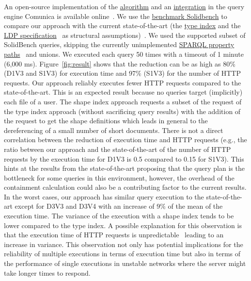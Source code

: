 An open-source implementation of the \href{https://github.com/constraintAutomaton/query-shape-detection}{algorithm} and an 
\href{https://github.com/constraintAutomaton/comunica-feature-link-traversal/tree/feature/shapeIndex}{integration} in the query engine 
Comunica \cite{taelman_iswc_resources_comunica_2018} is available online~.
We use the \href{https://github.com/SolidBench/SolidBench.js}{benchmark Solidbench} \cite{Taelman2023} to compare our approach with the current state-of-the-art (the \href{https://solid.github.io/type-indexes/}{type index} and the \href{https://www.w3.org/TR/ldp/}{LDP specification}~ as structural assumptions)~\cite{Taelman2023}.
We used the supported subset of SolidBench queries, skipping the currently unimplemented \href{https://www.w3.org/TR/sparql11-query/#propertypaths}{SPARQL property paths}~ and unions.
We executed each query 50 times with a timeout of 1 minute (6,000 ms).
Figure~\ref{fig:result} shows that the reduction can be as high as 80\% (D1V3 and S1V3) for execution time 
and 97\% (S1V3) for the number of HTTP requests.
Our approach reliably executes fewer HTTP requests compared to the state-of-the-art.
This is an expected result because no queries target (implicitly) each file of a user.
The shape index approach requests a subset of the request of the type index approach (without sacrificing query results) with the addition of the request to get the shape definitions which leads in general to the dereferencing of a small number of short documents.
There is not a direct correlation between the reduction of execution time and HTTP requests (e.g., the ratio 
between our approach and the state-of-the-art of the number of HTTP requests by the execution time for D1V3 is 0.5 compared to 0.15 for S1V3).
This hints at the results from the state-of-the-art \cite{Taelman2023} proposing that the query plan is the bottleneck for some queries in this environment,
however, the overhead of the containment calculation could also be a contributing factor to the current results.
In the worst cases, our approach  has similar query execution to the state-of-the-art except for D3V3 and D3V4 with an increase of 9\% of the mean of the execution time.
The variance of the execution with a shape index tends to be lower compared to the type index. 
A possible explanation for this observation is that the execution time of HTTP requests is unpredictable~\cite{hartig2016walking}
leading to an increase in variance.
This observation not only has potential implications for the reliability of multiple executions in terms of execution time
but also in terms of the performance of single executions in unstable networks where the server might take longer times to respond. 

